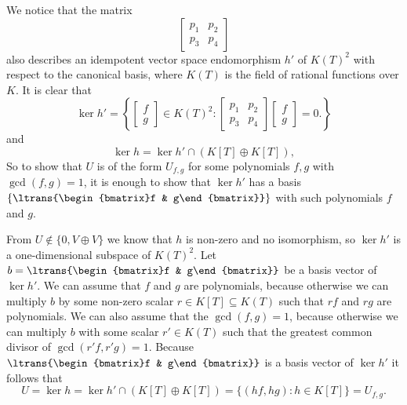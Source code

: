\documentclass[a4paper,10pt]{article}
\theoremstyle{definition}
\newcommand{\bvect}[1]{\begin{bmatrix}#1\end{bmatrix}}
\begin{document}
We notice that the matrix
\[
 \begin{bmatrix}
  p_1 & p_2 \\
  p_3 & p_4
 \end{bmatrix}
\]
also describes an idempotent vector space endomorphism $h'$ of $K(T)^2$ with respect to the canonical basis, where $K(T)$ is the field of rational functions over $K$. It is clear that
\[
 \ker h' = 
 \left\{ \bvect{f\\g} \in K(T)^2 : 
 \begin{bmatrix}
  p_1 & p_2 \\
  p_3 & p_4
 \end{bmatrix}
 \bvect{f\\g}
 = 0.
 \right\}
\]
and
\[
 \ker h = \ker h' \cap (K[T] \oplus K[T]),
\]
So to show that $U$ is of the form $U_{f,g}$ for some polynomials $f,g$ with $\gcd(f,g)=1$, it is enough to show that $\ker h'$ has a basis $\left\{\ltrans{\bvect{f & g}}\right\}$ with such polynomials $f$ and $g$.

From $U \not\in \{0, V \oplus V\}$ we know that $h$ is non-zero and no isomorphism, so $\ker h'$ is a one-dimensional subspace of $K(T)^2$. Let $b = \ltrans{\bvect{f & g}}$ be a basis vector of $\ker h'$. We can assume that $f$ and $g$ are polynomials, because otherwise we can multiply $b$ by some non-zero scalar $r \in K[T] \subseteq K(T)$ such that $rf$ and $rg$ are polynomials. We can also assume that the $\gcd(f,g)=1$, because otherwise we can multiply $b$ with some scalar $r' \in K(T)$ such that the greatest common divisor of $\gcd(r'f, r'g) = 1$. Because $\ltrans{\bvect{f & g}}$ is a basis vector of $\ker h'$ it follows that
\[
 U = \ker h = \ker h' \cap (K[T] \oplus K[T]) = \{(hf, hg) : h \in K[T]\} = U_{f,g}.
\]
\end{document}
